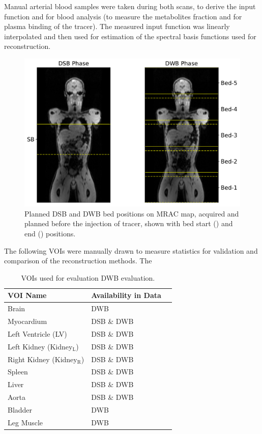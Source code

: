 Manual arterial blood samples were taken during both scans, to derive the input function and for blood analysis (to measure the metabolites fraction and for plasma binding of the tracer). The measured input function was linearly interpolated and then used for estimation of the spectral basis functions used for reconstruction. 

\begin{figure} [h!]
\centering
\includegraphics[scale=0.42,angle=0]{3_Results/3_3_DWB_Reconstruction/figures/3_3_IsotoPK_CTRL_PositionsOnMR.pdf}
\caption{Planned DSB and DWB bed positions on MRAC map, acquired and planned before the injection of tracer, shown with bed start (\protect{}) and end (\protect{}) positions.} 
\label{fig_3_3:IsotoPK_BedPositionsOnMR}
\end{figure} 

The following VOIs were manually drawn to measure statistics for validation and comparison of the reconstruction methods.
The 
\begin{table}[]
\centering
\caption{\label{tab:IsotoPK_VOIs} VOIs used for evaluation DWB evaluation.}
\begin{tabular}{lll}
\toprule
\textbf{VOI Name} & \textbf{Availability in Data}  \\
\midrule
Brain        & DWB                 \\
Myocardium & DSB \& DWB              \\
Left Ventricle (LV) & DSB \& DWB     \\
Left Kidney (Kidney$_\mathrm{L}$) & DSB \& DWB  \\
Right Kidney (Kidney$_\mathrm{R}$) & DSB \& DWB \\
Spleen & DSB \& DWB \\
Liver  & DSB \& DWB \\
Aorta & DSB \& DWB \\
Bladder & DWB \\
Leg Muscle & DWB \\
\toprule
\end{tabular}
\end{table}


